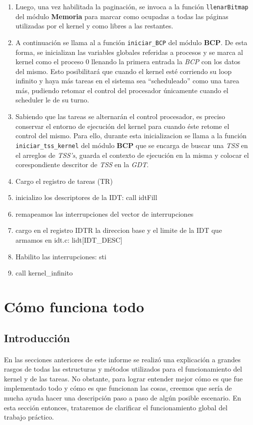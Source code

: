 \documentclass[11pt, a4paper]{article}
\begin{document}
\begin{enumerate}
		\item Luego, una vez habilitada la paginación, se invoca a la función \texttt{llenarBitmap} del módulo \textbf{Memoria} para marcar como ocupadas a todas las páginas utilizadas por el kernel y como libres a las restantes.
		\item A continuación se llama al a función \texttt{iniciar\_BCP} del módulo \textbf{BCP}. De esta forma, se inicializan las variables globales referidas a procesos y se marca al kernel como el proceso 0 llenando la primera entrada la \textit{BCP} con los datos del mismo. Esto posibilitará que cuando el kernel esté corriendo su loop infinito y haya más tareas en el sistema sea ``scheduleado'' como una tarea más, pudiendo retomar el control del procesador únicamente cuando el scheduler le de su turno.
		\item Sabiendo que las tareas se alternarán el control procesador, es preciso conservar el entorno de ejecución del kernel para cuando éste retome el control del mismo. Para ello, durante esta inicializacion se llama a la función \texttt{iniciar\_tss\_kernel} del módulo \textbf{BCP} que se encarga de buscar una \textit{TSS} en el arreglos de \textit{TSS's}, guarda el contexto de ejecución en la misma y colocar el corespondiente descritor de \textit{TSS} en la \textit{GDT}.
		\item Cargo el registro de tareas (TR)
		\item inicializo los descriptores de la IDT: call idtFill
		\item remapeamos las interrupciones del vector de interrupciones
		\item cargo en el registro IDTR la direccion base y el limite de la IDT que armamos en idt.c: lidt[IDT\_DESC]
		\item Habilito las interrupciones: sti
		\item call kernel\_infinito
	\end{enumerate}

\section{Cómo funciona todo}

\subsection{Introducción}
\paragraph{}
En las secciones anteriores de este informe se realizó una explicación a grandes rasgos de todas las estructuras y métodos utilizados para el funcionamiento del kernel y de las tareas. No obstante, para lograr entender mejor cómo es que fue implementado todo y cómo es que funcionan las cosas, creemos que sería de mucha ayuda hacer una descripción paso a paso de algún posible escenario. En esta sección entonces, trataremos de clarificar el funcionamiento global del trabajo práctico.
\end{document}
